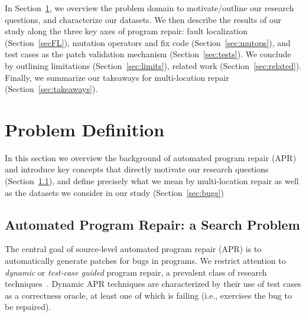 \documentclass[10pt, conference]{IEEEtran}
\begin{document}
In Section~\ref{sec:background}, we overview the problem domain to
motivate/outline our research questions, and characterize our datasets.
We then describe the results of our study along the
three key axes of program repair: fault localization (Section~\ref{secFL}),
mutation operators and fix code (Section~\ref{sec:mutops}), and test cases as
the patch validation mechanism (Section~\ref{sec:tests}).  We conclude by
outlining limitations (Section~\ref{sec:limits}), related work
(Section~\ref{sec:related}).  Finally, 
we summarize our takeaways for 
multi-location repair (Section~\ref{sec:takeaways}).

\section{Problem Definition}
\label{sec:background}

In this section we overview the background of automated program repair (APR) and
introduce key concepts that directly motivate our research questions
(Section~\ref{sec:apr}), and define precisely what we mean by multi-location
repair as well as the datasets we consider in our study (Section~\ref{sec:bugs})

\subsection{Automated Program Repair: a Search Problem}
\label{sec:apr}

The central goal of source-level automated program repair (APR) is to
automatically generate patches for bugs in programs. We restrict attention to
\emph{dynamic} or \emph{test-case guided} program repair, a prevalent class of
research techniques~\cite{cacm19}.  Dynamic APR techniques
are characterized by their use of test cases as a correctness oracle,
at least one of which is failing (i.e., exercises the bug
to be repaired).
\end{document}
